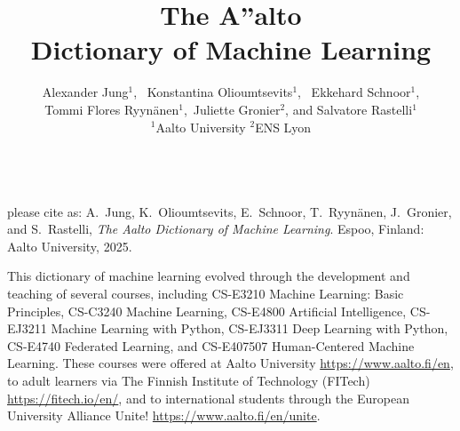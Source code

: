 \documentclass[journal,12pt,onecolumn]{article}
\begin{document}

\title {\vspace*{10mm}
	{\huge {\bf The {\fontsize{40}{48}\selectfont \textbf{\textsf{A\hspace*{-2mm}''}}}\hspace*{-4mm}alto \\ Dictionary of Machine Learning}}  \\[-5mm] 
}


\author{\hspace{-2mm}Alexander Jung${}^{1}$, \ Konstantina Olioumtsevits${}^{1}$, \ 
	Ekkehard Schnoor${}^{1}$, \\[-2mm] Tommi Flores Ryynänen${}^{1}$,\ 
	Juliette Gronier${}^{2}$, and Salvatore Rastelli${}^{1}$ \\[-2mm]
	${}^{1}$Aalto University \quad ${}^{2}$ENS Lyon
}

\maketitle
	\begin{center}
		\\[10mm]
{\large	please cite as: A.\ Jung, K.\ Olioumtsevits, E.\ Schnoor, T.\ Ryynänen, J.\ Gronier, and S.\ Rastelli, \textit{The Aalto Dictionary of Machine Learning}. Espoo, Finland: Aalto University, 2025.}
\end{center}

\newpage 
{}

\noindent This dictionary of machine learning evolved through the development 
and teaching of several courses, including CS-E3210 Machine Learning: Basic Principles, 
CS-C3240 Machine Learning, CS-E4800 Artificial Intelligence, CS-EJ3211 Machine Learning with Python, 
CS-EJ3311 Deep Learning with Python, CS-E4740 Federated Learning, and 
CS-E407507 Human-Centered Machine Learning. These courses were offered at 
Aalto University \url{https://www.aalto.fi/en}, to adult learners via 
The Finnish Institute of Technology (FITech) \url{https://fitech.io/en/}, and to international 
students through the European University Alliance Unite! \url{https://www.aalto.fi/en/unite}.
\end{document}
